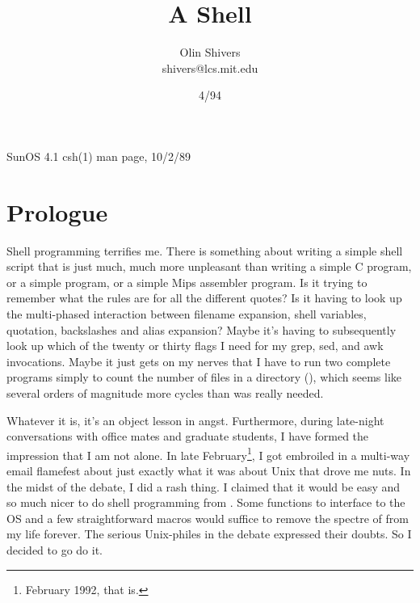 \newcommand{\subcaption}[1]
{\unskip\vspace{-2mm}\begin{center}\unskip\em#1\end{center}}

\makeatother



\title{A {\Scheme} Shell}
\author{Olin Shivers \\ {\ttt shivers@lcs.mit.edu}}
\date{4/94}

\maketitle
\pagestyle{empty}
\thispagestyle{empty}


        {SunOS 4.1 csh(1) man page, 10/2/89}
\vspace{-2em}


\section*{Prologue}
Shell programming terrifies me. There is something about writing a simple
shell script that is just much, much more unpleasant than writing a simple C
program, or a simple {\CommonLisp} program, or a simple Mips assembler program.
Is it trying to remember what the rules are for all the different quotes? Is
it having to look up the multi-phased interaction between filename expansion,
shell variables, quotation, backslashes and alias expansion? Maybe it's having
to subsequently look up which of the twenty or thirty flags I need for my
grep, sed, and awk invocations. Maybe it just gets on my nerves that I have to
run two complete programs simply to count the number of files in a directory
(), which seems like several orders of magnitude more cycles 
than was really needed.

Whatever it is, it's an object lesson in angst. Furthermore, during late-night
conversations with office mates and graduate students, I have formed the
impression that I am not alone. In late February\footnote{February 1992, that
is.}, I got embroiled in a multi-way email flamefest about just exactly what it
was about Unix that drove me nuts. In the midst of the debate, I did a rash
thing.  I claimed that it would be easy and so much nicer to do shell
programming from {\Scheme}. Some functions to interface to the OS and a few
straightforward macros would suffice to remove the spectre of 
from my life forever.  The serious Unix-philes in the debate expressed their
doubts.  So I decided to go do it.

